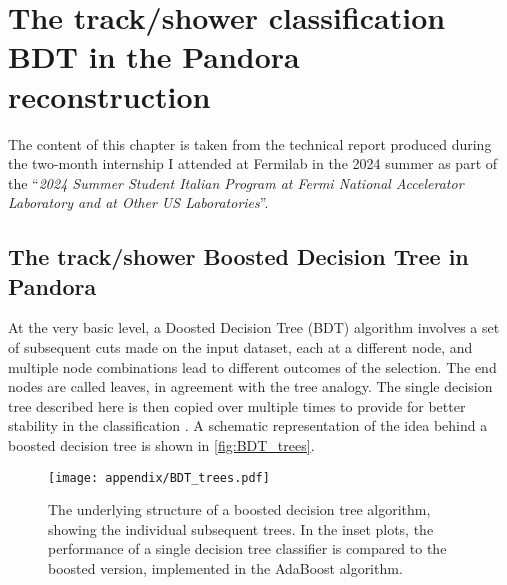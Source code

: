 \chapter{The track/shower classification BDT in the Pandora reconstruction}
\label{chap:mva_internship}
\setcounter{page}{1}
\renewcommand{\thepage}{\Alph{chapter}--\arabic{page}}

The content of this chapter is taken from the technical report produced during the two-month internship I attended at Fermilab in the 2024 summer as part of the ``\emph{2024 Summer Student Italian Program at Fermi National Accelerator Laboratory and at Other US Laboratories}''. 

\section{The track/shower Boosted Decision Tree in Pandora} \label{sec:A_bdt}

At the very basic level, a Doosted Decision Tree (BDT) algorithm involves a set of subsequent cuts made on the input dataset, each at a different node, and multiple node combinations lead to different outcomes of the selection. 
The end nodes are called leaves, in agreement with the tree analogy. 
The single decision tree described here is then copied over multiple times to provide for better stability in the classification \cite{Cornell:2021gut, FREUND1997119}. A schematic representation of the idea behind a boosted decision tree is shown in \autoref{fig:BDT_trees}. 

\begin{figure*}
    \centering
    \texttt{[image: appendix/BDT\_trees.pdf]}
    \caption[Boosted decision tree working principle]{The underlying structure of a boosted decision tree algorithm, showing the individual subsequent trees. In the inset plots, the performance of a single decision tree classifier is compared to the boosted version, implemented in the AdaBoost \cite{FREUND1997119} algorithm.}
    \label{fig:BDT_trees}
\end{figure*}



